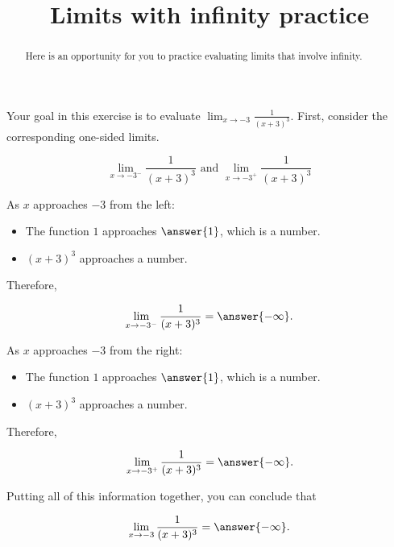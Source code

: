 \documentclass[handout]{ximera}
\title{Limits with infinity practice}
\begin{document}
\begin{abstract}
Here is an opportunity for you to practice evaluating limits that involve infinity.  
\end{abstract}
\maketitle

\begin{exercise}
Your goal in this exercise is to evaluate $\lim_{x \to -3} \frac{1}{(x+3)^3}$.  First, consider the corresponding one-sided limits. 

$$\lim_{x \to -3^-} \frac{1}{(x+3)^3} \text{ and } \lim_{x \to -3^+} \frac{1}{(x+3)^3}$$

As $x$ approaches $-3$ from the left:  

\begin{itemize}

\item The function $1$ approaches $\answer{1}$, which is a  number. 

\item $(x+3)^3$ approaches a  number. 

\end{itemize}

Therefore, 

 \[ \lim_{x \to -3^-} \frac{1}{(x+3)^3} = \answer{-\infty}.\]
 
As $x$ approaches $-3$ from the right: 

\begin{itemize}

\item The function $1$ approaches $\answer{1}$, which is a  number. 

\item $(x+3)^3$ approaches a  number. 

\end{itemize}

Therefore, 

 \[ \lim_{x \to -3^+} \frac{1}{(x+3)^3} = \answer{-\infty}. \]
 
Putting all of this information together, you can conclude that

\[ \lim_{x \to -3} \frac{1}{(x+3)^3} = \answer{-\infty}. \]

\end{exercise}
\end{document}
